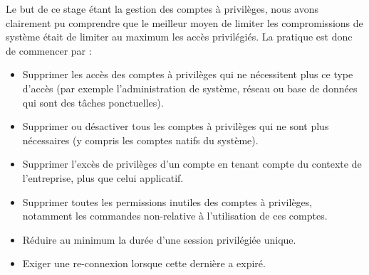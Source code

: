 Le but de ce stage étant la gestion des comptes à privilèges, nous avons clairement pu comprendre que le meilleur moyen de limiter les compromissions de système était de limiter au maximum les accès privilégiés. La pratique est donc de commencer par :
\begin{itemize}
	\item Supprimer les accès des comptes à privilèges qui ne nécessitent plus ce type d'accès (par exemple l'administration de système, réseau ou base de données qui sont des tâches ponctuelles).
	\item Supprimer ou désactiver tous les comptes à privilèges qui ne sont plus nécessaires (y compris les comptes natifs du système).
	\item Supprimer l'excès de privilèges d'un compte en tenant compte du contexte de l'entreprise, plus que celui applicatif.
	\item Supprimer toutes les permissions inutiles des comptes à privilèges, notamment les commandes non-relative à l'utilisation de ces comptes.
	\item Réduire au minimum la durée d'une session privilégiée unique.
	\item Exiger une re-connexion lorsque cette dernière a expiré.
\end{itemize}

